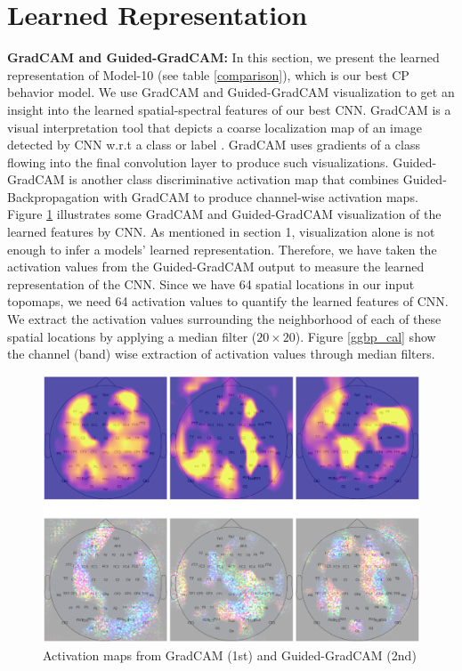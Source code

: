 \documentclass{article}
\begin{document}
\section{Learned Representation}

\textbf{GradCAM and Guided-GradCAM:} In this section, we present the learned representation of Model-10 (see table \ref{comparison}), which is our best CP behavior model. We use GradCAM and Guided-GradCAM visualization to get an insight into the learned spatial-spectral features of our best CNN. GradCAM is a visual interpretation tool that depicts a coarse localization map of an image detected by CNN w.r.t a class or label \cite{gradcam}. GradCAM uses gradients of a class flowing into the final convolution layer to produce such visualizations. Guided-GradCAM is another class discriminative activation map that combines Guided-Backpropagation \cite{allconvnet} with GradCAM to produce channel-wise activation maps. Figure \ref{ggbp} illustrates some GradCAM and Guided-GradCAM visualization of the learned features by CNN. As mentioned in section 1, visualization alone is not enough to infer a models' learned representation. Therefore, we have taken the activation values from the Guided-GradCAM output to measure the learned representation of the CNN. Since we have 64 spatial locations in our input topomaps, we need 64 activation values to quantify the learned features of CNN. We extract the activation values surrounding the neighborhood of each of these spatial locations by applying a median filter ($20 \times 20$). Figure \ref{ggbp_cal} show the channel (band) wise extraction of activation values through median filters.

\begin{figure}[ht]
\vskip 0.2in
\begin{center}
\centerline{\includegraphics[width=\columnwidth]{Images/sample_gradcam_ggbp}}
\caption[Activation maps from GradCAM and Guided-GradCAM]{Activation maps from GradCAM (1st) and Guided-GradCAM (2nd)}
\end{center}
\vskip -0.2in
\label{ggbp}
\end{figure}
\end{document}
